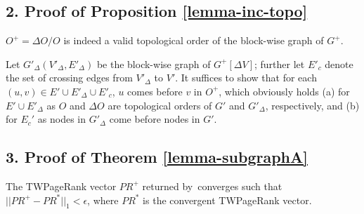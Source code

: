 \subsection*{2. Proof of Proposition \ref{lemma-inc-topo}}
$O^+=\Delta O/O$ is indeed a valid topological order of the block-wise graph of $G^+$.

\begin{proofS}
Let $G'_\Delta(V'_\Delta, E'_\Delta)$ be the block-wise graph of $G^+[\Delta V]$; further let $E'_c$ denote the set of crossing edges from $V'_\Delta$ to $V'$.
It suffices to show that for each $(u,v)\in E'\cup E'_\Delta \cup E'_c$, $u$ comes before $v$ in $O^+$,
which obviously holds (a) for  $E'\cup E'_\Delta$ as $O$ and $\Delta O$ are topological orders of $G'$ and $G'_\Delta$, respectively, and (b) for $E_{c}'$ as nodes in $G'_\Delta$ come before nodes in $G'$.
\end{proofS}



\subsection*{3. Proof of Theorem \ref{lemma-subgraphA}}
The TWPageRank vector $PR^+$ returned by~\inctwprscc converges such that $||PR^+-PR^{*}||_1 < \epsilon$, where $PR^{*}$ is the convergent TWPageRank vector.

